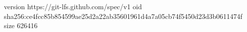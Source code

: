 version https://git-lfs.github.com/spec/v1
oid sha256:ce4fcc85b854599ae25d2a22ab35601961d4a7a05cb74f5450d23d3b0611474f
size 626416
